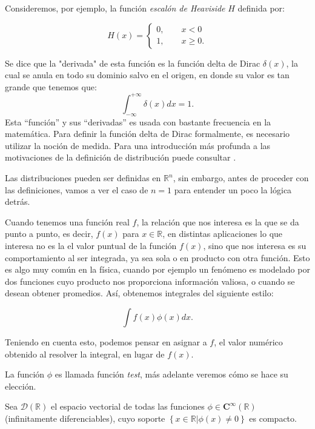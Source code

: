 \documentclass[letter,12pt]{article}
\begin{document}
Consideremos, por ejemplo, la función \textit{escalón de Heaviside} $ H $ definida por:

\begin{equation}
	H(x) = 
	\begin{cases}
		0, \qquad x < 0 \\
		1, \qquad x \ge 0. 
	\end{cases}
\end{equation}

Se dice que la "derivada" de esta función es la función delta de Dirac $ \delta(x) $, la cual se anula en todo su dominio salvo en el origen, en donde su valor es tan grande que tenemos que:
\begin{equation}
	\int_{-\infty}^{+\infty}\delta(x) dx = 1.
\end{equation} 
Esta ``función'' y sus ``derivadas'' es usada con bastante frecuencia en la matemática.
Para definir la función delta de Dirac formalmente, es necesario utilizar la noción de medida.
Para una introducción más profunda a las motivaciones de la definición 
de distribución puede consultar \cite{Strichartz}.

Las distribuciones pueden ser definidas en $ \mathbb{R}^n $, sin embargo, antes de proceder con las definiciones, vamos a ver el caso de $ n =1 $ para entender un poco la lógica detrás.

Cuando tenemos una función real $ f $, la relación que nos interesa es la que se da
punto a punto, es decir, $ f(x) $ para $ x \in \mathbb{R} $, 
en distintas aplicaciones lo que interesa no es la el valor puntual de la función 
$ f(x) $, sino que nos interesa es su comportamiento al ser integrada, ya sea sola 
o en producto con otra función. Esto es algo muy común en la física, cuando 
por ejemplo un fenómeno es modelado por dos funciones cuyo producto nos
proporciona información valiosa, o cuando se desean obtener promedios. 
Así, obtenemos integrales del siguiente estilo:

\begin{equation}
	\int{f(x)\phi(x)}dx.
\end{equation}

Teniendo en cuenta esto, podemos pensar en asignar a $ f $, el valor numérico obtenido 
al resolver la integral, en lugar de $ f(x) $.

La función $ \phi $ es llamada función \textit{test}, más adelante veremos cómo se hace 
su elección.

Sea $ \mathscr{D}(\mathbb{R}) $ el espacio vectorial de todas las funciones 
$ \phi \in \mathbf{C}^\infty (\mathbb{R}) $ (infinitamente diferenciables), cuyo soporte
$ \left\{ x\in \mathbb{R}| \phi(x) \neq 0 \right\} $ es compacto.
\end{document}
